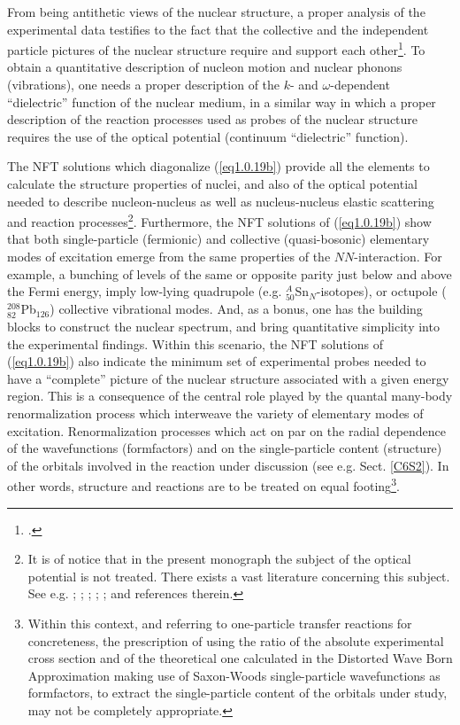 From being antithetic views of the nuclear structure, a proper analysis of the experimental data testifies to the fact that the collective and the independent particle pictures of the nuclear structure require and support each other\footnote{\cite{Bohr:75}.}. To obtain a quantitative description of nucleon  motion and nuclear phonons (vibrations), one needs a proper description of the $k$- and $\omega$-dependent ``dielectric'' function of the nuclear medium, in a similar way in which a proper description of the reaction processes used as probes of the nuclear structure requires the use of the optical potential (continuum ``dielectric'' function). 


The NFT solutions which diagonalize  (\ref{eq1.0.19b}) provide all the elements to calculate the structure properties of nuclei, and also of the optical potential needed to describe nucleon-nucleus as well as nucleus-nucleus elastic scattering and reaction processes\footnote{\label{f21c1} It is of notice that in the present monograph the subject of the optical potential is not treated.  There exists a vast literature concerning this subject. See e.g. \cite{Feshbach:58,Feshbach:62,Jackson:70,Jeukenne:76,Sartor:80,Pollarolo:83,Satchler:83,Mahaux:85,Broglia:04a,Dickhoff:05,Montanari:14,Dickhoff:17}; \cite{Dickhoff:19};  \cite{Fernandez:10}; \cite{Fernandez:10b}; \cite{Jenning:11};  \cite{Barbieri:05,Rotureau:17,Broglia:81b} and references therein.}.
Furthermore, the NFT solutions of (\ref{eq1.0.19b}) show that both single-particle (fermionic) and collective (quasi-bosonic) elementary modes of excitation emerge from the same properties of the $NN$-interaction. For example, a bunching of levels of the same or opposite parity just below and above the Fermi energy, imply low-lying quadrupole (e.g. $^A_{50}$Sn$_{N}$-isotopes), or octupole ($^{208}_{82}$Pb$_{126}$) collective vibrational modes. And, as a bonus, one has the building blocks to construct the nuclear spectrum, and bring quantitative simplicity into the experimental findings. Within this scenario, the NFT solutions of (\ref{eq1.0.19b}) also indicate the minimum set of experimental probes needed to have a ``complete'' picture of the nuclear structure associated with a given energy region. This is a consequence of the central role played by the quantal many-body renormalization process which interweave the variety of elementary modes of excitation.
Renormalization processes which act on par on the radial dependence of the wavefunctions (formfactors) and on the single-particle content (structure) of the orbitals involved in the reaction  under discussion (see e.g. Sect. \ref{C6S2}). In other words, structure and reactions are to be treated on equal footing\footnote{Within this context, and referring to one-particle transfer reactions for concreteness, the prescription of using the ratio of the absolute experimental cross section  and of the theoretical one calculated in the Distorted Wave Born Approximation making use of Saxon-Woods single-particle wavefunctions as formfactors, to extract the single-particle content of the orbitals under study, may not be completely appropriate.}. 




